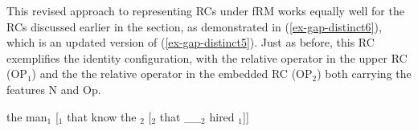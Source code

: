\noindent This revised approach to representing RCs under fRM works equally well for the RCs discussed earlier in the section, as demonstrated in (\ref{ex-gap-distinct6}), which is an updated version of (\ref{ex-gap-distinct5}). Just as before, this RC exemplifies the identity configuration, with the relative operator in the upper RC (OP$_1$) and the the relative operator in the embedded RC (OP$_2$) both carrying the features N and Op.

\pex \label{ex-gap-distinct6}
\ljudge*the man$_1$ [$_1$ that  know the $_2$ [$_2$ that \_\_$_2$ hired $_1$]]
\vspace{24pt}
\xe 



